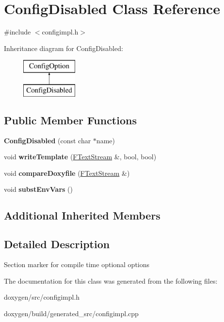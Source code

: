 \hypertarget{class_config_disabled}{}\section{Config\+Disabled Class Reference}
\label{class_config_disabled}


{\ttfamily \#include $<$configimpl.\+h$>$}

Inheritance diagram for Config\+Disabled\+:\begin{figure}[H]
\begin{center}
\leavevmode
\includegraphics[height=2.000000cm]{class_config_disabled}
\end{center}
\end{figure}
\subsection*{Public Member Functions}
\begin{DoxyCompactItemize}
\item 
\mbox{\label{class_config_disabled_a82bb5fed35515825e100630d2d974926}} 
{\bfseries Config\+Disabled} (const char $\ast$name)
\item 
\mbox{\label{class_config_disabled_a5319ee3a5cab4a4e46f3f860b4a7cdcd}} 
void {\bfseries write\+Template} (\mbox{\hyperlink{class_f_text_stream}{F\+Text\+Stream}} \&, bool, bool)
\item 
\mbox{\label{class_config_disabled_af0007c30783aac03245c49ced130763d}} 
void {\bfseries compare\+Doxyfile} (\mbox{\hyperlink{class_f_text_stream}{F\+Text\+Stream}} \&)
\item 
\mbox{\label{class_config_disabled_abee32dc488cf8350c44fa2203efd126d}} 
void {\bfseries subst\+Env\+Vars} ()
\end{DoxyCompactItemize}
\subsection*{Additional Inherited Members}


\subsection{Detailed Description}
Section marker for compile time optional options 

The documentation for this class was generated from the following files\+:\begin{DoxyCompactItemize}
\item 
doxygen/src/configimpl.\+h\item 
doxygen/build/generated\+\_\+src/configimpl.\+cpp\end{DoxyCompactItemize}
